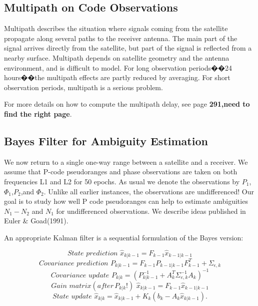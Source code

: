 \subsection{Multipath on Code Observations}

Multipath describes the situation where signals coming from the satellite propagate along
several paths to the receiver antenna. The main part of the signal arrives directly from the satellite, but part of the signal is reflected from a nearby surface. Multipath depends on satellite geometry and the antenna environment, and is difficult to model. For long observation periods��24 hours��the multipath effects are partly reduced by averaging. For short observation periods, multipath is a serious problem.

For more details on how to compute the multipath delay, see page\textbf{ 291,need to find the right page}.

\subsection{Bayes Filter for Ambiguity Estimation}

We now return to a single one-way range between a satellite and a receiver. We assume that P-code pseudoranges and phase observations are taken on both frequencies L1 and L2 for 50 epochs. As usual we denote the observations by $P_{1}$,$\Phi_{1}$,$P_{2}$,and $\Phi_{2}$. Unlike all earlier instances, the observations are undifferenced! Our goal is to study how well P code pseudoranges can help to estimate ambiguities $N_{1} - N_{2}$ and $N_{1}$ for undifferenced observations. We describe ideas published in Euler \& Goad(1991).

An appropriate Kalman filter is a sequential formulation of the Bayes version:

\begin{equation}
State \, \, prediction \, \, \hat{x}_{k|k-1}=F_{k-1}\hat{x}_{k-1|k-1}
\end{equation}
\begin{equation}
Covariance \, \, prediction \, \, P_{k|k-1}=F_{k-1}P_{k-1|k-1}F_{k-1}^{T}+\Sigma_{\epsilon,k}
\end{equation}
\begin{equation}
Covariance \, \, update \, \,P_{k|k}=(P_{k|k-1}^{-1}+A_{k}^{T}\Sigma_{e,k}^{-1}A_{k})^{-1}
\end{equation}
\begin{equation}
Gain \, \, matrix (after\,P_{k|k}!)\, \,  \hat{x}_{k|k-1}=F_{k-1}\hat{x}_{k-1|k-1}
\end{equation}
\begin{equation}
State \, \, update \, \,\hat{x}_{k|k}=\hat{x}_{k|k-1}+K_{k}(b_{k}-A_{k}\hat{x}_{k|k-1}).
\end{equation}

